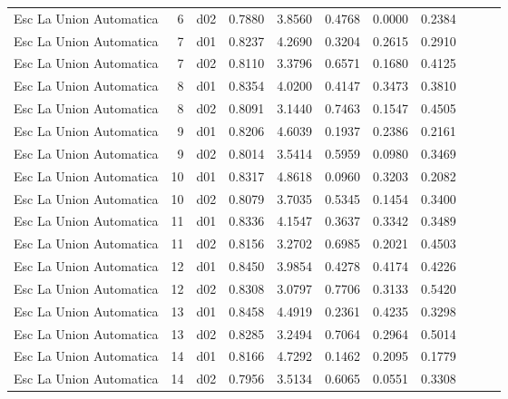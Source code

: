 \begin{landscape}
\begin{longtable}{p{2cm}rrrrrrrrrr}
  Esc La Union Automatica &          6 &     d02 &   0.7880 &  3.8560 &        0.4768 &           0.0000 &  0.2384 \\
  Esc La Union Automatica &          7 &     d01 &   0.8237 &  4.2690 &        0.3204 &           0.2615 &  0.2910 \\
  Esc La Union Automatica &          7 &     d02 &   0.8110 &  3.3796 &        0.6571 &           0.1680 &  0.4125 \\
  Esc La Union Automatica &          8 &     d01 &   0.8354 &  4.0200 &        0.4147 &           0.3473 &  0.3810 \\
  Esc La Union Automatica &          8 &     d02 &   0.8091 &  3.1440 &        0.7463 &           0.1547 &  0.4505 \\
  Esc La Union Automatica &          9 &     d01 &   0.8206 &  4.6039 &        0.1937 &           0.2386 &  0.2161 \\
  Esc La Union Automatica &          9 &     d02 &   0.8014 &  3.5414 &        0.5959 &           0.0980 &  0.3469 \\
  Esc La Union Automatica &         10 &     d01 &   0.8317 &  4.8618 &        0.0960 &           0.3203 &  0.2082 \\
  Esc La Union Automatica &         10 &     d02 &   0.8079 &  3.7035 &        0.5345 &           0.1454 &  0.3400 \\
  Esc La Union Automatica &         11 &     d01 &   0.8336 &  4.1547 &        0.3637 &           0.3342 &  0.3489 \\
  Esc La Union Automatica &         11 &     d02 &   0.8156 &  3.2702 &        0.6985 &           0.2021 &  0.4503 \\
  Esc La Union Automatica &         12 &     d01 &   0.8450 &  3.9854 &        0.4278 &           0.4174 &  0.4226 \\
  Esc La Union Automatica &         12 &     d02 &   0.8308 &  3.0797 &        0.7706 &           0.3133 &  0.5420 \\
  Esc La Union Automatica &         13 &     d01 &   0.8458 &  4.4919 &        0.2361 &           0.4235 &  0.3298 \\
  Esc La Union Automatica &         13 &     d02 &   0.8285 &  3.2494 &        0.7064 &           0.2964 &  0.5014 \\
  Esc La Union Automatica &         14 &     d01 &   0.8166 &  4.7292 &        0.1462 &           0.2095 &  0.1779 \\
  Esc La Union Automatica &         14 &     d02 &   0.7956 &  3.5134 &        0.6065 &           0.0551 &  0.3308 \\

\end{longtable}
\end{landscape}
